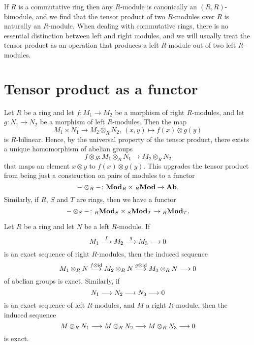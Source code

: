 If $R$ is a commutative ring then any $R$-module is canonically an $(R,R)$-bimodule, and we find that
the tensor product of two $R$-modules over $R$ is naturally an $R$-module. When dealing with commutative rings, there is no essential distinction between left and right modules, and we will usually treat the tensor product as an operation that produces a left $R$-module out of two left $R$-modules.





\section{Tensor product as a functor}

Let $R$ be a ring and let $f\colon M_1\to M_2$ be a morphism of right $R$-modules, and let $g\colon N_1\to N_2$ be a morphism of left $R$-modules. Then the map
\[
	M_1\times N_1 \to M_2\otimes_R N_2,\, (x,y) \mapsto f(x)\otimes g(y)
\]
is $R$-bilinear. Hence, by the universal property of the tensor product, there exists a unique homomorphism of abelian groups
\[
	f\otimes g\colon M_1\otimes_R N_1 \to M_2\otimes_R N_2
\]
that maps an element $x\otimes y$ to $f(x)\otimes g(y)$. This upgrades  the tensor product from being just a construction on pairs of modules to a functor
\[
	-\otimes_R-\colon \mathbf{Mod}_R \times {}_R\mathbf{Mod} \to \mathbf{Ab}.
\]
Similarly, if $R$, $S$ and $T$ are rings, then we have a functor
\[
	-\otimes_S- \colon {}_R\mathbf{Mod}_S \times {}_S\mathbf{Mod}_T \to {}_R\mathbf{Mod}_T.
\]
	
\begin{proposition}\label{prop:tensor-right-exact}
Let $R$ be a ring and let $N$ be a left $R$-module. If 
\begin{equation}\label{eq:pre-tensor-right-exact}
	M_1 \overset{f}{\longrightarrow} M_2 \overset{g}{\longrightarrow} M_3 \longrightarrow 0
\end{equation}
is an exact sequence of right $R$-modules, then the induced sequence
\begin{equation}\label{eq:tensor-right-exact}
	M_1\otimes_R N \overset{f\otimes {\rm id}}{\longrightarrow}
	M_2\otimes_R N \overset{g\otimes {\rm id}}{\longrightarrow}
	M_3\otimes_R N \longrightarrow 0
\end{equation}
of abelian groups is exact. Similarly, if
\[
	N_1 \longrightarrow N_2 \longrightarrow N_3 \longrightarrow 0
\]
is an exact sequence of left $R$-modules, and $M$ a right $R$-module, then the induced sequence
\[
	M \otimes_R N_1 \longrightarrow M \otimes_R N_2 \longrightarrow M \otimes_R N_3 \longrightarrow 0
\]
is exact.
\end{proposition}

